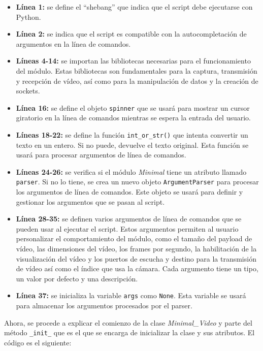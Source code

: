 \begin{itemize}
    \item \textbf{Línea 1:} se define el ``shebang'' que indica que el script debe ejecutarse con Python.
    \item \textbf{Línea 2:} se indica que el script es compatible con la autocompletación de argumentos en la línea de comandos.
    \item \textbf{Líneas 4-14:} se importan las bibliotecas necesarias para el funcionamiento del módulo. Estas bibliotecas son fundamentales para la captura, transmisión y recepción de vídeo, así como para la manipulación de datos y la creación de sockets.
    \item \textbf{Línea 16:} se define el objeto \texttt{spinner} que se usará para mostrar un cursor giratorio en la línea de comandos mientras se espera la entrada del usuario.
    \item \textbf{Líneas 18-22:} se define la función \texttt{int\_or\_str()} que intenta convertir un texto en un entero. Si no puede, devuelve el texto original. Esta función se usará para procesar argumentos de línea de comandos.
    \item \textbf{Líneas 24-26:} se verifica si el módulo \textit{Minimal} tiene un atributo llamado \texttt{parser}. Si no lo tiene, se crea un nuevo objeto \texttt{ArgumentParser} para procesar los argumentos de línea de comandos. Este objeto se usará para definir y gestionar los argumentos que se pasan al script.
    \item \textbf{Línea 28-35:} se definen varios argumentos de línea de comandos que se pueden usar al ejecutar el script. Estos argumentos permiten al usuario personalizar el comportamiento del módulo, como el tamaño del payload de vídeo, las dimensiones del vídeo, los frames por segundo, la habilitación de la visualización del vídeo y los puertos de escucha y destino para la transmisión de vídeo así como el índice que usa la cámara. Cada argumento tiene un tipo, un valor por defecto y una descripción.
    \item \textbf{Línea 37:} se inicializa la variable \texttt{args} como \texttt{None}. Esta variable se usará para almacenar los argumentos procesados por el parser.
\end{itemize}

\vspace{\baselineskip}

Ahora, se procede a explicar el comienzo de la clase \textit{Minimal\_Video} y parte del método \texttt{\_init\_} que es el que se encarga de inicializar la clase y sus atributos. El código es el siguiente:

